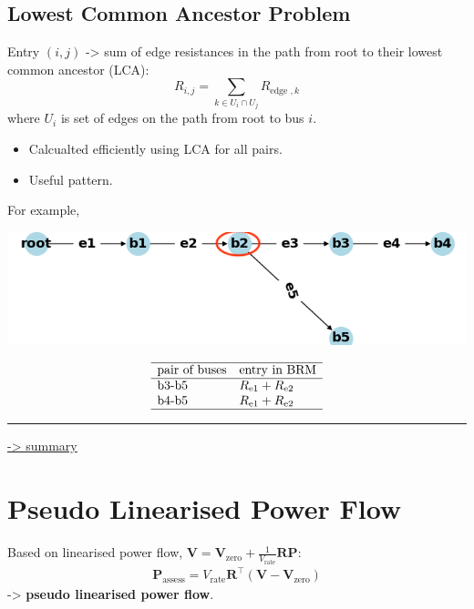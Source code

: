\documentclass[
]{book}
\providecommand{\tightlist}{%
  \setlength{\itemsep}{0pt}\setlength{\parskip}{0pt}}
\begin{document}
\hypertarget{LCA}{%
\subsection*{Lowest Common Ancestor Problem}\label{LCA}}

Entry \((i, j)\) -\textgreater{} sum of edge resistances in the path from root to their lowest
common ancestor (LCA):
\[
R_{i, j}=\sum_{k \in U_{i} \cap U_{j}} R_{\text {edge }, k}
\]
where \(U_{i}\) is set of edges on the path from root to bus \(i\).

\begin{itemize}
\tightlist
\item
  Calcualted efficiently using LCA for all pairs.
\item
  Useful pattern.
\end{itemize}

For example,

\begin{center}\includegraphics[width=0.7\linewidth]{Pictures/figCaseSix} \end{center}

\[ \begin{array}{ll}
  \hline
  \text{pair of buses} & \text{entry in BRM} \\
  \hline
  \text{b3-b5} & R_\text{e1} + R_\text{e2} \\
  \text{b4-b5} & R_\text{e1} + R_\text{e2} \\
  \hline
\end{array} \]

\begin{center}\rule{0.5\linewidth}{0.5pt}\end{center}

\protect\hyperlink{summary}{-\textgreater{} summary}

\hypertarget{brmInv}{%
\section{Pseudo Linearised Power Flow}\label{brmInv}}

Based on linearised power flow, \(\boldsymbol{V} = \boldsymbol{V}_\text{zero} + \frac{1}{V_\text{rate}} \boldsymbol{R} \boldsymbol{P}\):
\[ \begin{aligned}
    \boldsymbol{P}_\text{assess} =
    V_\text{rate} \boldsymbol{R}^{\top}
    \left( \boldsymbol{V} - \boldsymbol{V}_\text{zero} \right)
\end{aligned} \]
-\textgreater{} \textbf{pseudo linearised power flow}.
\end{document}
